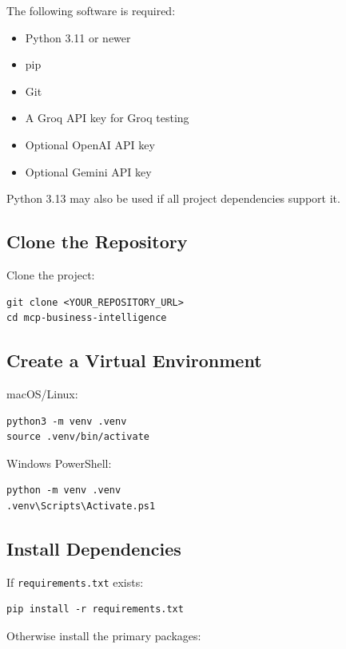 \documentclass[11pt,a4paper]{article}
\begin{document}
The following software is required:

\begin{itemize}
\item Python 3.11 or newer
\item pip
\item Git
\item A Groq API key for Groq testing
\item Optional OpenAI API key
\item Optional Gemini API key
\end{itemize}

Python 3.13 may also be used if all project dependencies support it.

\subsection{Clone the Repository}

Clone the project:

\begin{lstlisting}[style=terminal]
git clone <YOUR_REPOSITORY_URL>
cd mcp-business-intelligence
\end{lstlisting}

\subsection{Create a Virtual Environment}

macOS/Linux:

\begin{lstlisting}[style=terminal]
python3 -m venv .venv
source .venv/bin/activate
\end{lstlisting}

Windows PowerShell:

\begin{lstlisting}[style=terminal]
python -m venv .venv
.venv\Scripts\Activate.ps1
\end{lstlisting}

\subsection{Install Dependencies}

If \texttt{requirements.txt} exists:

\begin{lstlisting}[style=terminal]
pip install -r requirements.txt
\end{lstlisting}

Otherwise install the primary packages:
\end{document}
